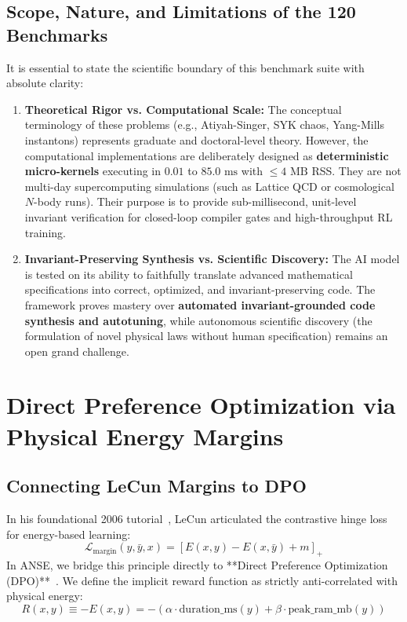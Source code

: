 \documentclass[10pt,journal,compsoc,twocolumn]{IEEEtran}
\theoremstyle{definition}
\begin{document}
\subsection{Scope, Nature, and Limitations of the 120 Benchmarks}
It is essential to state the scientific boundary of this benchmark suite with absolute clarity:
\begin{enumerate}
    \item \textbf{Theoretical Rigor vs. Computational Scale:} The conceptual terminology of these problems (e.g., Atiyah-Singer, SYK chaos, Yang-Mills instantons) represents graduate and doctoral-level theory. However, the computational implementations are deliberately designed as \textbf{deterministic micro-kernels} executing in $0.01$ to $85.0\text{ ms}$ with $\le 4\text{ MB}$ RSS. They are not multi-day supercomputing simulations (such as Lattice QCD or cosmological $N$-body runs). Their purpose is to provide sub-millisecond, unit-level invariant verification for closed-loop compiler gates and high-throughput RL training.
    \item \textbf{Invariant-Preserving Synthesis vs. Scientific Discovery:} The AI model is tested on its ability to faithfully translate advanced mathematical specifications into correct, optimized, and invariant-preserving code. The framework proves mastery over \textbf{automated invariant-grounded code synthesis and autotuning}, while autonomous scientific discovery (the formulation of novel physical laws without human specification) remains an open grand challenge.
\end{enumerate}

\section{Direct Preference Optimization via Physical Energy Margins}

\subsection{Connecting LeCun Margins to DPO}
In his foundational 2006 tutorial~\cite{lecun2006tutorial}, LeCun articulated the contrastive hinge loss for energy-based learning:
\begin{equation}
\mathcal{L}_{\text{margin}}(y, \bar{y}, x) = [E(x, y) - E(x, \bar{y}) + m]_+
\end{equation}
In ANSE, we bridge this principle directly to **Direct Preference Optimization (DPO)**~\cite{rafailov2024direct}. We define the implicit reward function as strictly anti-correlated with physical energy:
\begin{equation}
R(x, y) \equiv -E(x, y) = -\left(\alpha \cdot \text{duration\_ms}(y) + \beta \cdot \text{peak\_ram\_mb}(y)\right)
\end{equation}
\end{document}
